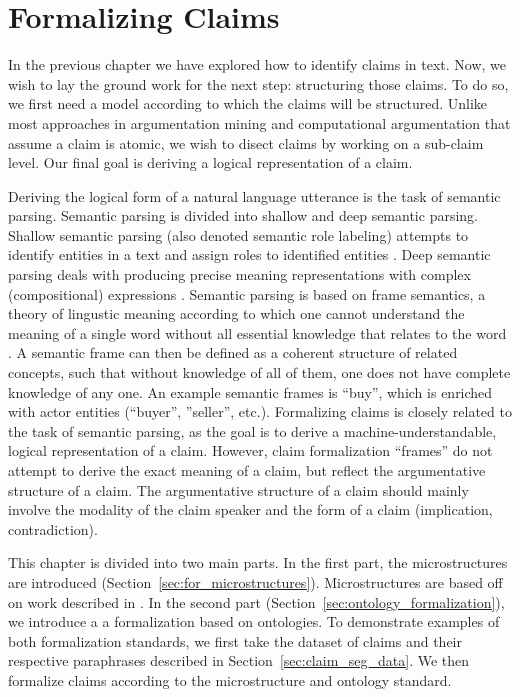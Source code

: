 \chapter{Formalizing Claims}
\label{chap:formalization}

In the previous chapter we have explored how to identify claims in text.
Now, we wish to lay the ground work for the next step: structuring those claims. 
To do so, we first need a model according to which the claims will be structured. 
Unlike most approaches in argumentation mining and computational argumentation that
assume a claim is atomic, we wish to disect claims by working on a 
sub-claim level. Our final goal is deriving a logical representation of a claim. 

Deriving the logical form of a natural language utterance is the task of
semantic parsing. Semantic parsing is divided into shallow and deep semantic parsing. 
Shallow semantic parsing (also denoted semantic role labeling) attempts to
identify entities in a text and assign roles to identified entities
\citep{pradhan2004shallow}. 
Deep semantic parsing deals with producing precise meaning representations
with complex (compositional) expressions \citep{pasupat2015compositional}. 
Semantic parsing is based on frame semantics, a theory of lingustic meaning
according to which one cannot understand the meaning of a single word without
all essential knowledge that relates to the word \citep{fillmore2006frame}.
A semantic frame can then be defined as a coherent structure of related concepts,
such that without knowledge of all of them, one does not have complete knowledge
of any one. An example semantic frames is ``buy'',  which is 
enriched with actor entities (``buyer'', ''seller'', etc.).
Formalizing claims is closely related to the task of semantic parsing, as the
goal is to derive a machine-understandable, logical representation of a claim.
However, claim formalization ``frames'' do not attempt to derive the exact
meaning of a claim, but reflect the argumentative structure of a claim. 
The argumentative structure of a claim should mainly involve the modality of the
claim speaker and the form of a claim (implication, contradiction). 

This chapter is divided into two main parts.  In the first part, the
microstructures are introduced (Section~\ref{sec:for_microstructures}).
Microstructures are based off on work described in \citep{boltuzic2017toward}.
In the second part (Section~\ref{sec:ontology_formalization}), we introduce a a
formalization based on ontologies. To demonstrate examples of both formalization
standards, we first take the dataset of claims and their respective paraphrases
described in Section~\ref{sec:claim_seg_data}. We then formalize claims 
according to the microstructure and ontology standard.

